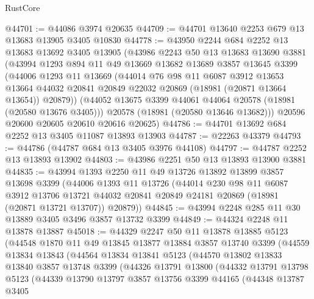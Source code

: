 \begin{lexlean}{RustCore}
\begin{coremodule}
@44701 := @44086 @3974 @20635
@44709 := @44701 @13640 @2253 @679 @13 @13683 @13905 @3405 @10830
@44778 := @43950
    @2244
    @684
    @2252
    @13
    @13683
    @13692
    @3405
    @13905
    (@43986
      @2243
      @50
      @13
      @13683
      @13690
      @3881
      (@43994
        @1293
        @894
        @11
        @49
        @13669
        @13682
        @13689
        @3857
        @13645
        @3399
        (@44006
          @1293
          @11
          @13669
          (@44014
            @76
            @98
            @11
            @6087
            @3912
            @13653
            @13664
            @44032
            @20841
            @20849
            @22032
            @20869
            (@18981 (@20871 @13664 @13654))
            @20879))
        (@44052 @13675 @3399 @44061 @44064 @20578 (@18981 (@20580 @13676 @3405)))
        @20578
        (@18981 (@20580 @13646 @13682)))
      @20596
      @20600
      @20605
      @20610
      @20616
      @20625)
@44786 := @44701 @13692 @684 @2252 @13 @3405 @11087 @13893 @13903
@44787 := @22263 @43379
@44793 := @44786 (@44787 @684 @13 @3405 @3976 @44108)
@44797 := @44787 @2252 @13 @13893 @13902
@44803 := @43986 @2251 @50 @13 @13893 @13900 @3881
@44835 := @43994
    @1393
    @2250
    @11
    @49
    @13726
    @13892
    @13899
    @3857
    @13698
    @3399
    (@44006
      @1393
      @11
      @13726
      (@44014
        @230
        @98
        @11
        @6087
        @3912
        @13706
        @13721
        @44032
        @20841
        @20849
        @24181
        @20869
        (@18981 (@20871 @13721 @13707))
        @20879))
@44845 := @43994 @2248 @285 @11 @30 @13889 @3405 @3496 @3857 @13732 @3399
@44849 := @44324 @2248 @11 @13878 @13887
@45018 := @44329
    @2247
    @50
    @11
    @13878
    @13885
    @5123
    (@44548
      @1870
      @11
      @49
      @13845
      @13877
      @13884
      @3857
      @13740
      @3399
      (@44559
        @13834
        @13843
        (@44564
          @13834
          @13841
          @5123
          (@44570
            @13802
            @13833
            @13840
            @3857
            @13748
            @3399
            (@44326
              @13791
              @13800
              (@44332
                @13791
                @13798
                @5123
                (@44339
                  @13790
                  @13797
                  @3857
                  @13756
                  @3399
                  @44165
                  (@44348
                    @13787
                    @3405

\end{coremodule}
\end{lexlean}
